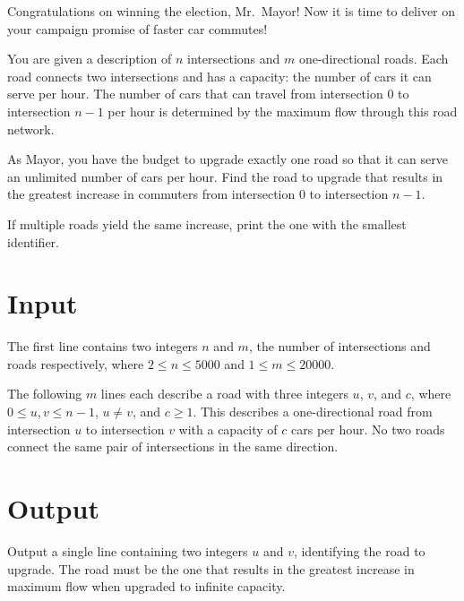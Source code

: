 
Congratulations on winning the election, Mr.\ Mayor! Now it is time to deliver on your campaign promise of faster car commutes!

You are given a description of $n$ intersections and $m$ one-directional roads. Each road connects two intersections and has a capacity: the number of cars it can serve per hour. The number of cars that can travel from intersection $0$ to intersection $n-1$ per hour is determined by the maximum flow through this road network.

As Mayor, you have the budget to upgrade exactly one road so that it can serve an unlimited number of cars per hour. Find the road to upgrade that results in the greatest increase in commuters from intersection $0$ to intersection $n-1$.

If multiple roads yield the same increase, print the one with the smallest identifier.

\section*{Input}

The first line contains two integers $n$ and $m$, the number of intersections and roads respectively, where $2 \leq n \leq 5000$ and $1 \leq m \leq 20000$.

The following $m$ lines each describe a road with three integers $u$, $v$, and $c$, where $0 \leq u, v \leq n-1$, $u \neq v$, and $c \geq 1$. This describes a one-directional road from intersection $u$ to intersection $v$ with a capacity of $c$ cars per hour. No two roads connect the same pair of intersections in the same direction.

\section*{Output}

Output a single line containing two integers $u$ and $v$, identifying the road to upgrade. The road must be the one that results in the greatest increase in maximum flow when upgraded to infinite capacity.
